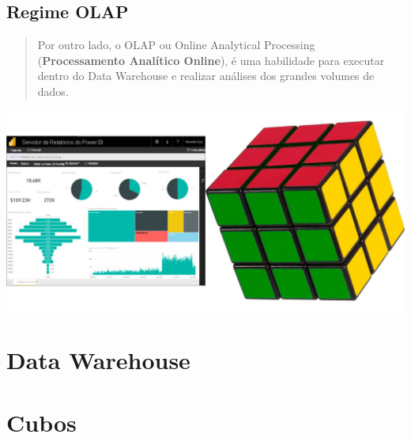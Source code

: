 \documentclass[
]{book}
\begin{document}
\subsection{Regime OLAP}\label{regime-olap}

\begin{quote}
Por outro lado, o OLAP ou Online Analytical Processing (\textbf{Processamento Analítico Online}), é uma habilidade para executar dentro do Data Warehouse e realizar análises dos grandes volumes de dados.
\end{quote}

\includegraphics{images/5-bi/09-cubo3.jpg}

\section{Data Warehouse}\label{data-warehouse}

\section{Cubos}\label{cubos}
\end{document}
